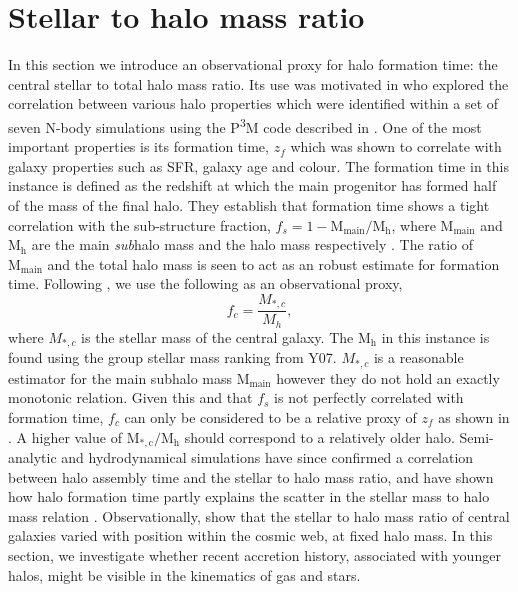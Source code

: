\section{Stellar to halo mass ratio}\label{sec:MsMh_hab}
In this section we introduce an observational proxy for halo formation time: the central stellar to total halo mass ratio. Its use was motivated in \citet{wang2011} who explored the correlation between various halo properties which were identified within a set of seven N-body simulations using the P\textsuperscript{3}M code described in \citet{jing2007}. One of the most important properties is its formation time, $z_f$ which was shown to correlate with galaxy properties such as SFR, galaxy age and colour. The formation time in this instance is defined as the redshift at which the main progenitor has formed half of the mass of the final halo. %
They establish that formation time shows a tight correlation with the sub-structure fraction, $f_s = 1 - \mathrm{M_{main}/M_h}$, where $\mathrm{M_{main}}$ and $\mathrm{M_h}$ are the main \textit{sub}halo mass and the halo mass respectively \citep{gao2007}. 
The ratio of $\mathrm{M_{main}}$ and the total halo mass is seen to act as an robust estimate for formation time. Following \citet{lim2015}, we use the following as an observational proxy,
\begin{equation}
f_c = \frac{M_{*,c}}{M_h},
\end{equation}
where $M_{*,c}$ is the stellar mass of the central galaxy. The $\mathrm{M_h}$ in this instance is found using the group stellar mass ranking from Y07. $M_{*,c}$ is a reasonable estimator for the main subhalo mass $\mathrm{M_{main}}$ however they do not hold an exactly monotonic relation. Given this and that $f_s$ is not perfectly correlated with formation time, $f_c$ can only be considered to be a relative proxy of $z_f$ as shown in \citet{lim2015}. A higher value of $\mathrm{M_{*,c}/M_h}$ should correspond to a relatively older halo. 
Semi-analytic and hydrodynamical simulations have since confirmed a correlation between halo assembly time and the stellar to halo mass ratio, and have shown how halo formation time partly explains the scatter in the stellar mass to halo mass relation \citep[e.g.][]{matthee2017,tojeiro2017,zehavi2018}. Observationally, \cite{tojeiro2017} show that the stellar to halo mass ratio of central galaxies varied with position within the cosmic web, at fixed halo mass. In this section, we investigate whether recent accretion history, associated with younger halos, might be visible in the kinematics of gas and stars.

